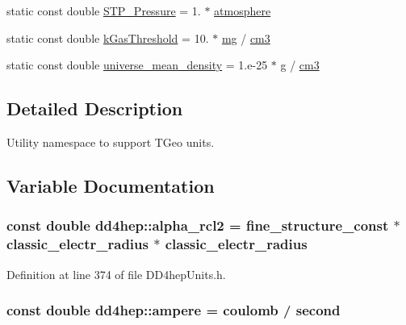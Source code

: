 \begin{DoxyCompactItemize}
\item 
static const double \hyperlink{namespacedd4hep_a9ace4de2d3dba6a0e6f3d0ab29a498aa}{STP\_\-Pressure} = 1. $\ast$ \hyperlink{namespacedd4hep_a3907dd93dc8fc5b2f3b0fb9b92e46c5b}{atmosphere}
\item 
static const double \hyperlink{namespacedd4hep_ad7b0ac954bae8a93a0162f9f08fd9766}{kGasThreshold} = 10. $\ast$ \hyperlink{namespacedd4hep_a16e0deb2b676a8d02ab7cf5cf7a8237b}{mg} / \hyperlink{namespacedd4hep_a6464c11bda4aa7d6c4d42f70dbcaf803}{cm3}
\item 
static const double \hyperlink{namespacedd4hep_a139a30c8403dfa4a6294daf563d735dd}{universe\_\-mean\_\-density} = 1.e-\/25 $\ast$ \hyperlink{namespacedd4hep_a70d02ec06109b52625ae28861ff25d56}{g} / \hyperlink{namespacedd4hep_a6464c11bda4aa7d6c4d42f70dbcaf803}{cm3}
\end{DoxyCompactItemize}


\subsection{Detailed Description}
Utility namespace to support TGeo units. 

\subsection{Variable Documentation}
\hypertarget{namespacedd4hep_affee5485f0351ee3618be1021c703e23}{
\subsubsection[{alpha\_\-rcl2}]{\setlength{\rightskip}{0pt plus 5cm}const double {\bf dd4hep::alpha\_\-rcl2} = {\bf fine\_\-structure\_\-const} $\ast$ {\bf classic\_\-electr\_\-radius} $\ast$ {\bf classic\_\-electr\_\-radius}}}
\label{namespacedd4hep_affee5485f0351ee3618be1021c703e23}


Definition at line 374 of file DD4hepUnits.h.\hypertarget{namespacedd4hep_a1342ab2280c2fed87fe4beaebae8cf52}{
\subsubsection[{ampere}]{\setlength{\rightskip}{0pt plus 5cm}const double {\bf dd4hep::ampere} = {\bf coulomb} / {\bf second}}}
\label{namespacedd4hep_a1342ab2280c2fed87fe4beaebae8cf52}


